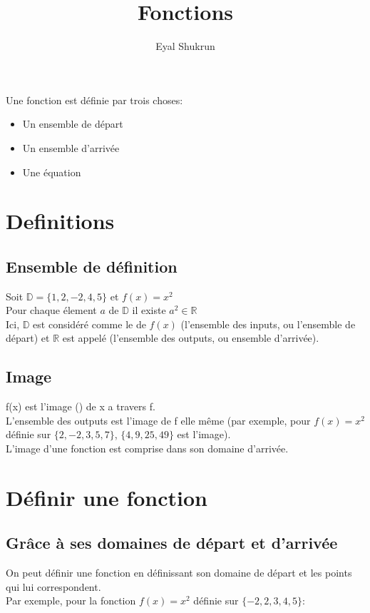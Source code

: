 \documentclass{article}
\title{Fonctions}
\author{Eyal Shukrun}
\begin{document}
\maketitle

Une fonction est définie par trois choses:
\begin{itemize}
  \item Un ensemble de départ
  \item Un ensemble d'arrivée
  \item Une équation
\end{itemize}


\section{Definitions}
\subsection{Ensemble de définition}
Soit $\mathbb{D} = \{1, 2, -2, 4, 5\}$ et $f(x) = x^2$\\
Pour chaque élement $a$ de $\mathbb{D}$ il existe $a^2 \in \mathbb{R}$\\
Ici, $\mathbb{D}$ est considéré comme le  de $f(x)$ (l'ensemble des inputs, ou l'ensemble de départ) et $\mathbb{R}$ est appelé  (l'ensemble des outputs, ou ensemble d'arrivée).\\
\subsection{Image}
f(x) est l'image () de x a travers f.\\
L'ensemble des outputs est l'image de f elle même (par exemple, pour $f(x) = x^2$ définie sur $\{2, -2, 3, 5, 7\}$, 
$\{4, 9, 25, 49\}$ est l'image).\\
L'image d'une fonction est comprise dans son domaine d'arrivée.

\section{Définir une fonction}
\subsection{Grâce à ses domaines de départ et d'arrivée}
On peut définir une fonction en définissant son domaine de départ et les points qui lui correspondent.\\
Par exemple, pour la fonction $f(x) = x^2$ définie sur $\{-2, 2, 3, 4, 5\}$:
\end{document}
